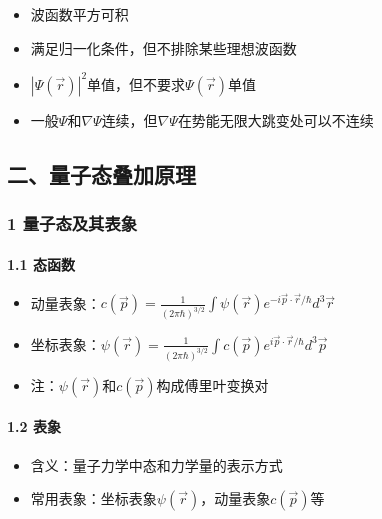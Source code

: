 \documentclass[UTF8,twocolumn]{ctexart}
\providecommand{\tightlist}{%
  \setlength{\itemsep}{0pt}\setlength{\parskip}{0pt}}
\let\oldparagraph\paragraph
\renewcommand{\paragraph}[1]{\oldparagraph{#1}\mbox{}}
\begin{document}
\begin{itemize}
\tightlist
\item
  波函数平方可积
\item
  满足归一化条件，但不排除某些理想波函数
\item
  \(|\Psi(\vec{r})|^2\)单值，但不要求\(\Psi(\vec{r})\)单值
\item
  一般\(\Psi\)和\(\nabla\Psi\)连续，但\(\nabla\Psi\)在势能无限大跳变处可以不连续
\end{itemize}

\hypertarget{ux4e8cux91cfux5b50ux6001ux53e0ux52a0ux539fux7406}{%
\subsection{二、量子态叠加原理}\label{ux4e8cux91cfux5b50ux6001ux53e0ux52a0ux539fux7406}}

\hypertarget{ux91cfux5b50ux6001ux53caux5176ux8868ux8c61}{%
\subsubsection{1
量子态及其表象}\label{ux91cfux5b50ux6001ux53caux5176ux8868ux8c61}}

\hypertarget{ux6001ux51fdux6570}{%
\paragraph{{ }1.1 态函数}\label{ux6001ux51fdux6570}}

\begin{itemize}
\tightlist
\item
  动量表象：\(c(\vec{p})=\frac{1}{(2\pi\hbar)^{3/2}}\int\psi(\vec{r})e^{-i\vec{p}\cdot\vec{r}/\hbar}d^3\vec{r}\)
\item
  坐标表象：\(\psi(\vec{r})=\frac{1}{(2\pi\hbar)^{3/2}}\int c(\vec{p})e^{i\vec{p}\cdot\vec{r}/\hbar}d^3\vec{p}\)
\item
  注：\(\psi(\vec{r})\)和\(c(\vec{p})\)构成傅里叶变换对
\end{itemize}

\hypertarget{ux8868ux8c61}{%
\paragraph{{ }1.2 表象}\label{ux8868ux8c61}}

\begin{itemize}
\tightlist
\item
  含义：量子力学中态和力学量的表示方式
\item
  常用表象：坐标表象\(\psi(\vec{r})\)，动量表象\(c(\vec{p})\)等
\end{itemize}
\end{document}
